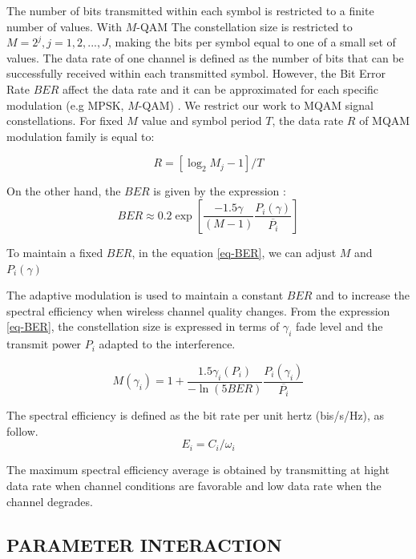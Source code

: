 \documentclass[conference]{IEEEtran}
\begin{document}
The number of bits transmitted within each symbol is restricted to a finite number of values. With $M$-QAM The constellation size is restricted to $M=2^{j}, j=1,2,...,J$, making the bits per symbol equal to one of a small set of values. The data rate of one channel is defined as the number of bits that can be successfully received within each transmitted symbol. However, the Bit Error Rate $BER$ affect the data rate and it can be approximated for each specific modulation (e.g MPSK, $M$-QAM) \cite{Cheng2008}. We restrict our work to MQAM signal constellations. For fixed $M$ value and symbol period $T$, the data rate $R$ of MQAM modulation \cite{Goldsmith1998} family is equal to:

\[R=[\log_{2}M_{j}-1]/T
\]

On the other hand, the $BER$ is given by the expression \cite{Goldsmith1997} :
\begin{equation}
\label{eq-BER}
BER\approx0.2\exp\left[\frac{-1.5\gamma}{(M-1)}\frac{P_{i}(\gamma)}{\overline{P_{i}}}\right]
\end{equation}
 

To maintain a fixed $BER$, in the equation \ref{eq-BER}, we can adjust $M$ and $P_{i}(\gamma)$

The adaptive modulation is used to maintain a constant $BER$ and to increase the spectral efficiency when wireless channel quality changes. From the expression \ref{eq-BER}, the constellation size is expressed in terms of  $\gamma_{i}$ fade level and the transmit power $P_{i}$ adapted to the interference. 

\begin{equation}
\label{eq-M}
M(\gamma_{i})=1+\frac{1.5\gamma_{i}(P_{i})}{-\ln(5BER)}
 \frac{P_{i}(\gamma_{i})}{\overline{P_{i}}}
\end{equation}

The spectral efficiency is defined as the bit rate per unit hertz (bis/s/Hz), as follow. 
\begin{equation}
\label{efficiency}
E_{i} = C_{i}/\omega_{i}
\end{equation}


The maximum spectral efficiency average is obtained by transmitting at hight data rate when channel conditions are favorable and low data rate when the channel degrades. 
 
\subsection{PARAMETER INTERACTION}
 
\end{document}

